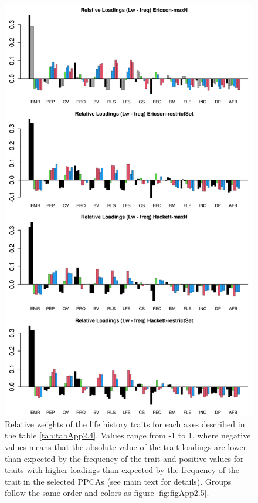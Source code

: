 \begin{figure}[ht!]
\centering
\includegraphics[width=.8\textwidth]{./Figures/Appendix2_1/2nd relWeights plots-ALL.png}
\caption[LHT relative importance of the secondary axes]{
Relative weights of the life history traits for each axes described in the
table \ref{tab:tabApp2.4}. Values range from -1 to 1, where negative values
means that the absolute value of the trait loadings are lower than expected by
the frequency of the trait and positive values for traits with higher loadings
than expected by the frequency of the trait in the selected PPCAs (see main
text for details). Groups follow the same order and colors as figure
\ref{fig:figApp2.5}.}
\label{fig:figApp2.4}
\end{figure}

